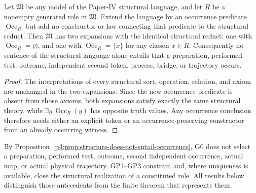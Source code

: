 \documentclass[12pt,a4paper]{article}
\begin{document}
\begin{proposition}
\label{p4:prop:structure-does-not-entail-occurrence}
Let \(\mathfrak M\) be any model of the Paper-IV structural language, and
let \(R\) be a nonempty generated role in \(\mathfrak M\).  Extend the
language by an occurrence predicate \(\operatorname{Occ}_R\) but add no
constructor or law connecting that predicate to the structural reduct.  Then
\(\mathfrak M\) has two expansions with the identical structural reduct:
one with \(\operatorname{Occ}_R=\varnothing\), and one with
\(\operatorname{Occ}_R=\{x\}\) for any chosen \(x\in R\).  Consequently no
sentence of the structural language alone entails that a preparation,
performed test, outcome, independent second token, process, bridge, or
trajectory occurs.
\end{proposition}

\begin{proof}
The interpretations of every structural sort, operation, relation, and axiom
are unchanged in the two expansions.  Since the new occurrence predicate is
absent from those axioms, both expansions satisfy exactly the same structural
theory, while \(\exists y\,\operatorname{Occ}_R(y)\) has opposite truth
values.  Any occurrence conclusion therefore needs either an explicit token
or an occurrence-preserving constructor from an already occurring witness.
\end{proof}

By Proposition~\ref{p4:prop:structure-does-not-entail-occurrence}, G0 does
not select a preparation, performed test, outcome, second independent
occurrence, actual map, or actual physical trajectory.  GP1--GP3
constrain and, where uniqueness is available, close the structural realization
of a constituted role.  All results
below distinguish those antecedents from the finite theorem that represents
them.
\end{document}
